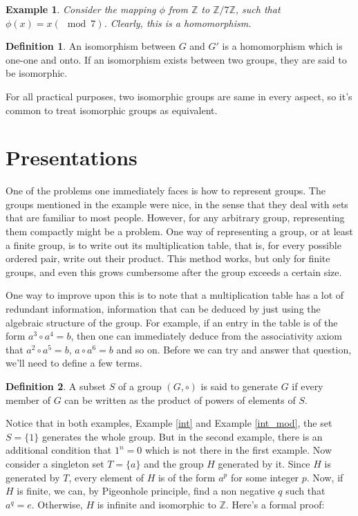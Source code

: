 \documentclass[12pt]{article}
\newtheorem{exmp}[thm]{Example}
\theoremstyle{definition}
\newtheorem{defn}{Definition}[section]
\begin{document}
\begin{exmp}
Consider the mapping $\phi$ from $\mathbb{Z}$ to $\mathbb{Z}/7\mathbb{Z}$, such that $\phi(x) = x (\mod 7)$. Clearly, this is a homomorphism.
\end{exmp}

\begin{defn}
An isomorphism between $G$ and $G'$ is a homomorphism which is one-one and onto. If an isomorphism exists between two groups, they are said to be isomorphic.
\end{defn}

For all practical purposes, two isomorphic groups are same in every aspect, so it's common to treat isomorphic groups as equivalent.

\section{Presentations}

One of the problems one immediately faces is how to represent groups. The groups mentioned in the example were nice, in the sense that they deal with sets that are familiar to most people. However, for any arbitrary group, representing them compactly might be a problem. One way of representing a group, or at least a finite group, is to write out its multiplication table, that is, for every possible ordered pair, write out their product. This method works, but only for finite groups, and even this grows cumbersome after the group exceeds a certain size.

One way to improve upon this is to note that a multiplication table has a lot of redundant information, information that can be deduced by just using the algebraic structure of the group. For example, if an entry in the table is of the form $a^3 \circ a^4 = b$, then one can immediately deduce from the associativity axiom that $a^2 \circ a^5 = b$, $a \circ a^6 = b$ and so on. Before we can try and answer that question, we'll need to define a few terms. \cite{johnson}

\begin{defn}
A subset $S$ of a group $(G, \circ)$ is said to generate $G$ if every member of $G$ can be written as the product of powers of elements of $S$.
\end{defn}

Notice that in both examples, Example \autoref{int} and Example \autoref{int_mod}, the set $S = \{1\}$ generates the whole group. But in the second example, there is an additional condition that $1^n=0$ which is not there in the first example. Now consider a singleton set $T = \{a\}$ and the group $H$ generated by it. Since $H$ is generated by $T$, every element of $H$ is of the form $a^p$ for some integer $p$. Now, if $H$ is finite, we can, by Pigeonhole principle, find a non negative $q$ such that $a^q=e$. Otherwise, $H$ is infinite and isomorphic to $\mathbb{Z}$. Here's a formal proof:
\end{document}
